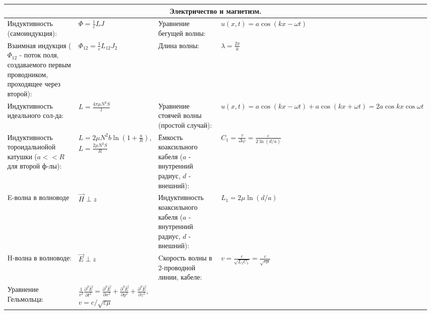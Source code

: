 \documentclass{article}
\begin{document}
\begin{tabular}{ |p{5cm}|p{4.5cm}|p{6cm}|p{3.5cm}|  }
\hline
\multicolumn{4}{|c|}{Электричество и магнетизм.} \\
\hline
Индуктивность (самоиндукция):                                              &
$\Phi=\frac{1}{c} L J$                                                     &
Уравнение бегущей волны:                                                   &
$u(x, t)=a \cos (k x-\omega t)$                                            \\
\hline
Взаимная индукция ($\Phi_{12}$ - поток поля, создаваемого первым проводником, проходящее через второй): &
$\Phi_{12}=\frac{1}{c} L_{12} J_{2}$                                       &
Длина волны:                                                               &
$\lambda=\frac{2 \pi}{k}$                                                  \\
\hline
Индуктивность идеального сол-да:                                           &
$L=\frac{4 \pi \mu N^{2} S}{l}$                                            &
Уравнение стоячей волны (простой случай):                                  &
$u(x, t)=a \cos (k x-\omega t)+a \cos (k x+\omega t)=2 a \cos k x \cos \omega t$\\
\hline
Индуктивность тороидальнойой катушки ($a << R$ для второй ф-лы):           &
$L=2 \mu N^{2} b \ln \left(1+\frac{a}{R}\right)$,
$L=\frac{2 \mu N^{2} S}{R}$                                                &
Ёмкость коаксильного кабеля ($a$ - внутренний радиус, $d$ - внешний):      &
$C_{1}=\frac{\tau}{\Delta \varphi}=\frac{\varepsilon}{2 \ln (d / a)}$      \\
\hline
E-волна в волноводе                                                        &
$\vec{H} \perp z$                                                          &
Индуктивность коаксильного кабеля ($a$ - внутренний радиус, $d$ - внешний):&
$L_{1}=2 \mu \ln (d / a)$                                                  \\
\hline
H-волна в волноводе:                                                       &
$\vec{E} \perp z$                                                          &
Cкорость волны в 2-проводной линии, кабеле:                                &
$v=\frac{c}{\sqrt{L_{1} C_{1}}}=\frac{c}{\sqrt{\varepsilon \mu}}$          \\
\hline
Уравнение Гельмольца:                                                      &
$\frac{1}{v^{2}} \frac{\partial^{2} \vec{E}}{\partial t^{2}}=\frac{\partial^{2} \vec{E}}{\partial x^{2}}+\frac{\partial^{2} \vec{E}}{\partial y^{2}}+\frac{\partial^{2} \vec{E}}{\partial z^{2}}$, $v=c / \sqrt{\varepsilon \mu}$&

\end{tabular}
\end{document}
